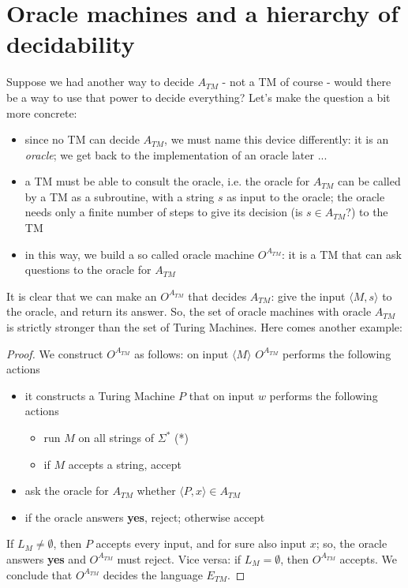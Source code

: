 
\section{Oracle machines and a hierarchy of decidability}

Suppose we had another way to decide $A_{TM}$ - not a TM of course -
would there be a way to use that power to decide everything? Let's
make the question a bit more concrete:
\begin{itemize}
\item since no TM can decide $A_{TM}$, we must name this device
  differently: it is an {\em oracle}; we get back to the
  implementation of an oracle later ...

\item a TM must be able to consult the oracle, i.e. the oracle for
  $A_{TM}$ can be called by a TM as a subroutine, with a string $s$ as
  input to the oracle; the oracle needs only a finite number of steps
  to give its decision (is $s \in A_{TM}$?) to the TM

\item in this way, we build a so called oracle machine $O^{A_{TM}}$:
  it is a TM that can ask questions to the oracle for $A_{TM}$
\end{itemize}

It is clear that we can make an $O^{A_{TM}}$ that decides $A_{TM}$:
give the input $\langle M,s \rangle$ to the oracle, and return its
answer. So, the set of oracle machines with oracle $A_{TM}$ is
strictly stronger than the set of Turing Machines. Here comes another
example:


\begin{proof}
We construct $O^{A_{TM}}$ as follows: on input $\langle M \rangle$
$O^{A_{TM}}$ performs the following actions
\begin{itemize}
\item 
it constructs a Turing Machine $P$ that on input $w$ performs the
following actions
\begin{itemize}
\item run $M$ on all strings of $\Sigma^*$ (*)\label{allestrings}
\item if $M$ accepts a string, accept
\end{itemize}

\item ask the oracle for $A_{TM}$ whether $\langle P,x \rangle \in
  A_{TM}$

\item if the oracle answers {\bf yes}, reject; otherwise accept
\end{itemize}
If $L_M \neq \emptyset$, then $P$ accepts every input, and for sure
also input $x$; so, the oracle answers {\bf yes} and $O^{A_{TM}}$ must
reject. Vice versa: if $L_M = \emptyset$, then $O^{A_{TM}}$
accepts. We conclude that $O^{A_{TM}}$ decides the language $E_{TM}$.
\end{proof}

